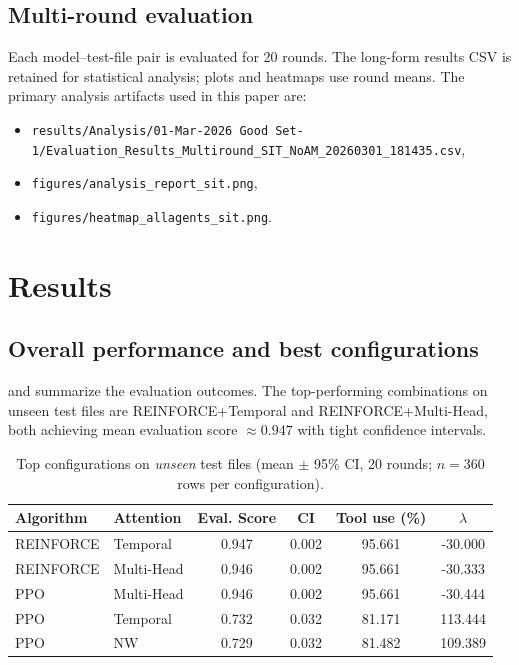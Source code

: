 \documentclass[11pt]{article}
\begin{document}
\subsection{Multi-round evaluation}
Each model--test-file pair is evaluated for 20 rounds. The long-form results CSV is retained for statistical analysis; plots and heatmaps use round means. The primary analysis artifacts used in this paper are:
\begin{itemize}
  \item \texttt{results/Analysis/01-Mar-2026 Good Set-1/Evaluation\_Results\_Multiround\_SIT\_NoAM\_20260301\_181435.csv},
  \item \texttt{figures/analysis\_report\_sit.png},
  \item \texttt{figures/heatmap\_allagents\_sit.png}.
\end{itemize}

\section{Results}
\subsection{Overall performance and best configurations}
 and  summarize the evaluation outcomes. The top-performing combinations on unseen test files are \textsc{REINFORCE}+Temporal and \textsc{REINFORCE}+Multi-Head, both achieving mean evaluation score $\approx 0.947$ with tight confidence intervals.

\begin{table}[t]
\centering
\caption{Top configurations on \emph{unseen} test files (mean $\pm$ 95\% CI, 20 rounds; $n=360$ rows per configuration).}
\label{tab:top}
\begin{tabular}{ll S[table-format=1.3] S[table-format=1.3] S[table-format=2.3] S[table-format=3.3]}
\toprule
\textbf{Algorithm} & \textbf{Attention} & {\textbf{Eval. Score}} & {\textbf{CI}} & {\textbf{Tool use (\%)}} & {\textbf{$\lambda$}} \\
\midrule
REINFORCE & Temporal   & 0.947 & 0.002 & 95.661 & -30.000 \\
REINFORCE & Multi-Head & 0.946 & 0.002 & 95.661 & -30.333 \\
PPO       & Multi-Head & 0.946 & 0.002 & 95.661 & -30.444 \\
PPO       & Temporal   & 0.732 & 0.032 & 81.171 & 113.444 \\
PPO       & NW         & 0.729 & 0.032 & 81.482 & 109.389 \\
\bottomrule
\end{tabular}
\end{table}
\end{document}
